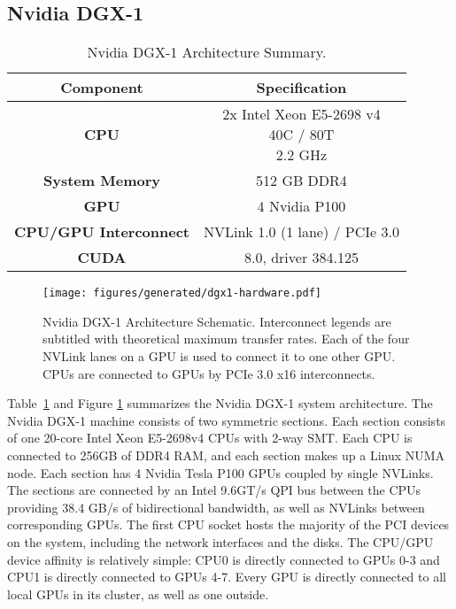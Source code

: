 \subsection{Nvidia DGX-1}
\label{sec:dgx1}

\begin{table}[ht]
    \centering
    \caption[Nvidia DGX-1 Architecture Summary]{
		Nvidia DGX-1 Architecture Summary.
	}
    \label{tab:dgx1}
    \begin{tabular}{cc}
    \hline
    \textbf{Component}                     & \textbf{Specification}                                      \\ \hline
    \textbf{CPU}                  & \makecell{2x Intel Xeon E5-2698 v4 \\ 40C / 80T \\ 2.2 GHz} \\ \hline
    \textbf{System Memory}        & 512 GB DDR4                                                 \\ \hline
	\textbf{GPU}                  & 4 Nvidia P100                                               \\ \hline
	\textbf{CPU/GPU Interconnect} & NVLink 1.0 (1 lane) / PCIe 3.0                              \\ \hline
	\textbf{CUDA}                 & 8.0, driver 384.125                                         \\ \hline
    \end{tabular}
\end{table}

\begin{figure}[ht]
    \centering
	\texttt{[image: figures/generated/dgx1-hardware.pdf]}
    \caption[Nvidia DGX-1 Architecture Schematic]{
		Nvidia DGX-1 Architecture Schematic.
		Interconnect legends are subtitled with theoretical maximum transfer rates.
		Each of the four NVLink lanes on a GPU is used to connect it to one other GPU.
		CPUs are connected to GPUs by PCIe 3.0 x16 interconnects.
	}
    \label{fig:topo-dgx-simple}
\end{figure}

Table~\ref{tab:dgx1} and Figure \ref{fig:topo-dgx-simple} summarizes the Nvidia DGX-1 system architecture.
The Nvidia DGX-1 machine consists of two symmetric sections\cite{nvidia2017dgx1}.
Each section consists of one 20-core Intel Xeon E5-2698v4 CPUs with 2-way SMT.
Each CPU is connected to 256GB of DDR4 RAM, and each section makes up a Linux NUMA node.
Each section has 4 Nvidia Tesla P100 GPUs coupled by single NVLinks.
The sections are connected by an Intel 9.6GT/s QPI bus between the CPUs providing 38.4 GB/s of bidirectional bandwidth, as well as NVLinks between corresponding GPUs.
The first CPU socket hosts the majority of the PCI devices on the system, including the network interfaces and the disks.
The CPU/GPU device affinity is relatively simple: CPU0 is directly connected to GPUs 0-3 and CPU1 is directly connected to GPUs 4-7.
Every GPU is directly connected to all local GPUs in its cluster, as well as one outside.

